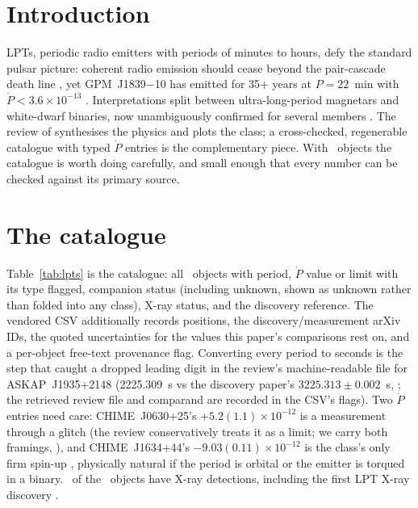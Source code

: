 \documentclass[twocolumn]{aastex631}
\begin{document}
\section{Introduction}
LPTs, periodic radio emitters with periods of minutes to hours, defy the standard pulsar
picture: coherent radio emission should cease beyond the pair-cascade death line \citep{ruderman1975}, yet
GPM~J1839$-$10 has emitted for 35+ years at $P=22$~min with $\dot P<3.6\times10^{-13}$
\citep{hurleywalker2023}. Interpretations split between ultra-long-period magnetars
\citep[e.g.][]{caleb2024,dong2025a} and white-dwarf binaries, now unambiguously confirmed for
several members \citep{deruiter2025}. The review of \citet{rea2026} synthesises the physics and plots the class; a cross-checked,
regenerable catalogue with typed $\dot P$ entries is the complementary piece. With \lptN\
objects the catalogue is worth doing carefully, and small enough that every number can be
checked against its primary source.

\section{The catalogue}
Table~\ref{tab:lpts} is the catalogue: all \lptN\ objects with period, $\dot P$ value or
limit with its type flagged, companion status (including unknown, shown as unknown
rather than folded into any class), X-ray status, and the discovery reference. The vendored
CSV additionally records positions, the discovery/measurement arXiv IDs, the quoted
uncertainties for the values this paper's comparisons rest on, and a per-object free-text
provenance flag. Converting every period to seconds is the step that caught a dropped leading
digit in the review's machine-readable file for ASKAP~J1935+2148 (2225.309~s vs the discovery
paper's $3225.313\pm0.002$~s, \citealt{caleb2024}; the retrieved review file and comparand are
recorded in the CSV's flags). Two $\dot P$ entries need care: CHIME~J0630+25's
$+5.2(1.1)\times10^{-12}$ is a measurement through a glitch (the review conservatively treats
it as a limit; we carry both framings, \citealt{dong2025a}), and CHIME~J1634+44's
$-9.03(0.11)\times10^{-12}$ is the class's only firm spin-up \citep{dong2025b}, physically
natural if the period is orbital or the emitter is torqued in a binary. \lptNx\ of the
\lptN\ objects have X-ray detections, including the first LPT X-ray discovery
\citep{wang2025}.
\end{document}
